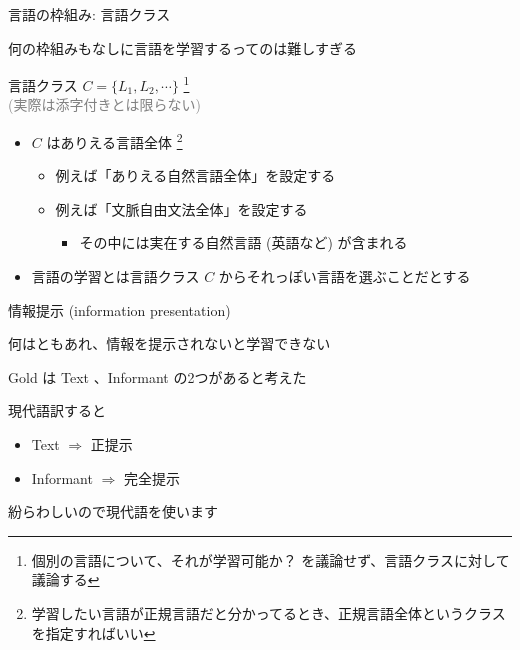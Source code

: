 \documentclass[professionalfont, 12pt, dvipdfmx, default, cjk]{beamer}
\begin{document}
\begin{frame}{言語の枠組み: 言語クラス}

何の枠組みもなしに言語を学習するってのは難しすぎる

\vspace*{3mm}

\centering
言語クラス \(C = \{ L_1, L_2, \cdots \}\)
\footnote{個別の言語について、それが学習可能か？ を議論せず、言語クラスに対して議論する}\\\footnotesize \textcolor{gray}{(実際は添字付きとは限らない)}
\normalsize
\flushleft

\begin{itemize}
\itemsep1pt\parskip0pt
\item
  \(C\) はありえる言語全体
  \footnote{学習したい言語が正規言語だと分かってるとき、正規言語全体というクラスを指定すればいい}

  \begin{itemize}
  \itemsep1pt\parskip0pt
  \item
    例えば「ありえる自然言語全体」を設定する
  \item
    例えば「文脈自由文法全体」を設定する

    \begin{itemize}
    \itemsep1pt\parskip0pt
    \item
      その中には実在する自然言語 (英語など) が含まれる
    \end{itemize}
  \end{itemize}
\item
  言語の学習とは言語クラス \(C\) からそれっぽい言語を選ぶことだとする
\end{itemize}

\end{frame}

\begin{frame}{情報提示 (information presentation)}

何はともあれ、情報を提示されないと学習できない

Gold は Text 、Informant の2つがあると考えた

現代語訳すると

\begin{itemize}
\itemsep1pt\parskip0pt
\item
  Text \(\Rightarrow\) 正提示
\item
  Informant \(\Rightarrow\) 完全提示
\end{itemize}

紛らわしいので現代語を使います

\end{frame}
\end{document}

